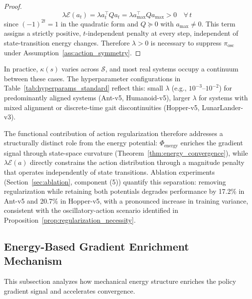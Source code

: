 \documentclass[journal]{IEEEtran}
\begin{document}
\begin{proof}
		\begin{equation}
			\lambda\mathcal{E}(a_t) = \lambda a_t^\top Q a_t = \lambda a_{\max}^\top Q a_{\max} > 0
			\quad \forall\, t
		\end{equation}
		since $(-1)^{2t}=1$ in the quadratic form and $Q\succeq 0$ with $a_{\max}\neq 0$. This term assigns a strictly positive, $t$-independent penalty at every step, independent of state-transition energy changes. Therefore $\lambda>0$ is necessary to suppress $\pi_{\text{osc}}$ under Assumption~\ref{ass:action_symmetry}.
	\end{proof}
	
	In practice, $\kappa(s)$ varies across $\mathcal{S}$, and most real systems occupy a continuum between these cases. The hyperparameter configurations in Table~\ref{tab:hyperparams_standard} reflect this: small $\lambda$ (e.g., $10^{-3}$--$10^{-2}$) for predominantly aligned systems (Ant-v5, Humanoid-v5), larger $\lambda$ for systems with mixed alignment or discrete-time gait discontinuities (Hopper-v5, LunarLander-v3).
	
	The functional contribution of action regularization therefore addresses a structurally distinct role from the energy potential: $\Phi_{\text{energy}}$ enriches the gradient signal through state-space curvature (Theorem~\ref{thm:energy_convergence}), while $\lambda\mathcal{E}(a)$ directly constrains the action distribution through a magnitude penalty that operates independently of state transitions. Ablation experiments (Section~\ref{sec:ablation}, component (5)) quantify this separation: removing regularization while retaining both potentials degrades performance by 17.2\% in Ant-v5 and 20.7\% in Hopper-v5, with a pronounced increase in training variance, consistent with the oscillatory-action scenario identified in Proposition~\ref{prop:regularization_necessity}.
	
	\subsection{Energy-Based Gradient Enrichment Mechanism}
	
	This subsection analyzes how mechanical energy structure enriches the policy gradient signal and accelerates convergence.
	
\end{document}
